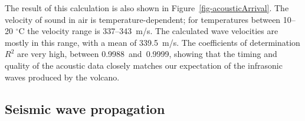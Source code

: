 The result of this calculation is also shown in
Figure~\ref{fig-acousticArrival}.  The velocity of sound in air is
temperature-dependent; for temperatures between 10--20 $^{\circ}$C
the velocity range is 337--343~m/s.  The calculated wave velocities are
mostly in this range, with a mean of 339.5~m/s. The coefficients of
determination $R^2$ are very high, between
0.9988~and~0.9999, showing that the timing and quality of the
acoustic data closely matches our expectation
of the infrasonic waves produced by the volcano.


\subsection{Seismic wave propagation}

